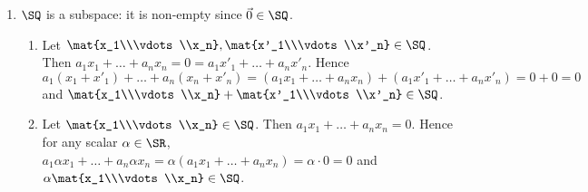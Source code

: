 \begin{exercises}
\begin{problist}
\begin{solution}
\begin{enumerate}
				\item $\SQ$ is a subspace: it is non-empty since $\vec 0\in\SQ$. 
				\begin{enumerate}
					\item Let $\mat{x_1\\\vdots\\x_n},\mat{x'_1\\\vdots\\x'_n}\in \SQ$. Then $a_1x_1+\ldots+a_nx_n=0=a_1x'_1+\ldots+a_nx'_n$. Hence $a_1(x_1+x'_1)+\ldots+a_n(x_n+x'_n)=(a_1x_1+\ldots+a_nx_n)+(a_1x'_1+\ldots+a_nx'_n)=0+0=0$ and $\mat{x_1\\\vdots\\x_n}+\mat{x'_1\\\vdots\\x'_n}\in\SQ$.

					\item Let $\mat{x_1\\\vdots\\x_n}\in\SQ$. Then $a_1 x_1+\ldots+a_nx_n=0$. Hence for any scalar $\alpha\in\SR$, $a_1\alpha x_1+\ldots+a_n\alpha x_n=\alpha(a_1x_1+\ldots+a_nx_n)=\alpha\cdot 0=0$ and $\alpha\mat{x_1\\\vdots\\x_n}\in\SQ$.
				\end{enumerate}
			\end{enumerate}
		\end{solution}


\end{problist}
\end{exercises}
